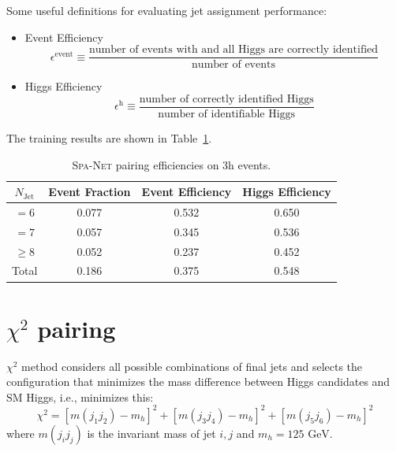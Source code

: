 \documentclass[12pt]{article}
\begin{document}
        Some useful definitions for evaluating jet assignment performance:
        \begin{itemize}
        \item Event Efficiency
        \begin{equation}
            \epsilon^{\text{event}} \equiv \frac{\text{number of events with and all Higgs are correctly identified}}{\text{number of events}}
        \end{equation}

        \item Higgs Efficiency
        \begin{equation}
            \epsilon^{\text{h}} \equiv \frac{\text{number of correctly identified Higgs}}{\text{number of identifiable Higgs}}
        \end{equation}
    \end{itemize}
        The training results are shown in Table~\ref{tab:SPANet_triHiggs_0b}.
        \begin{table}[htpb]
            \centering
            \caption{\textsc{Spa-Net} pairing efficiencies on 3h events.}
            \label{tab:SPANet_triHiggs_0b}
            \begin{tabular}{c|c|cc}
                $N_\text{Jet}$ & Event Fraction & Event Efficiency & Higgs Efficiency \\
                \hline
                $=6$      &   0.077             &    0.532              &    0.650             \\
                $=7$      &   0.057             &    0.345              &    0.536             \\
                $\ge 8$   &   0.052             &    0.237              &    0.452             \\
                Total     &   0.186             &    0.375              &    0.548
            \end{tabular}
        \end{table}
\section{\texorpdfstring{$\chi^2$}{chi2} pairing}%
\label{sec:chi2_pairing}
    $\chi^2$ method considers all possible combinations of final jets and selects the configuration that minimizes the mass difference between Higgs candidates and SM Higgs, i.e., minimizes this:
    \begin{equation}\label{eq:triHiggs_chisq}
        \chi^2 = [m(j_1j_2) - m_h]^2 + [m(j_3j_4) - m_h]^2 + [m(j_5j_6) - m_h]^2
    \end{equation}
    where $m(j_ij_j)$ is the invariant mass of jet $i, j$ and $m_h = \text{125 GeV}$.
\end{document}
